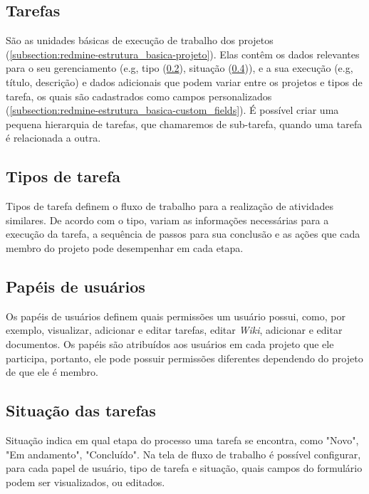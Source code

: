 \subsection{Tarefas}\label{subsection:redmine-estrutura_basica-tarefa}

São as unidades básicas de execução de trabalho dos projetos (\ref{subsection:redmine-estrutura_basica-projeto}). Elas contêm os dados relevantes para o seu gerenciamento (e.g, tipo (\ref{subsection:redmine-estrutura_basica-tracker}), situação (\ref{subsection:redmine-estrutura_basica-status})), e a sua execução (e.g, título, descrição) e dados adicionais que podem variar entre os projetos e tipos de tarefa, os quais são cadastrados como campos personalizados (\ref{subsection:redmine-estrutura_basica-custom_fields}). É possível criar uma pequena hierarquia de tarefas, que chamaremos de sub-tarefa, quando uma tarefa é relacionada a outra.

\subsection{Tipos de tarefa}\label{subsection:redmine-estrutura_basica-tracker}

Tipos de tarefa definem o fluxo de trabalho para a realização de atividades similares. De acordo com o tipo, variam as informações necessárias para a execução da tarefa, a sequência de passos para sua conclusão e as ações que cada membro do projeto pode desempenhar em cada etapa.

\subsection{Papéis de usuários}\label{subsection:redmine-estrutura_basica-role}

Os papéis de usuários definem quais permissões um usuário possui, como, por exemplo, visualizar, adicionar e editar tarefas, editar \textit{Wiki}, adicionar e editar documentos. Os papéis são atribuídos aos usuários em cada projeto que ele participa, portanto, ele pode possuir permissões diferentes dependendo do projeto de que ele é membro.

\subsection{Situação das tarefas}\label{subsection:redmine-estrutura_basica-status}

Situação indica em qual etapa do processo uma tarefa se encontra, como "Novo", "Em andamento", "Concluído". Na tela de fluxo de trabalho é possível configurar, para cada papel de usuário, tipo de tarefa e situação, quais campos do formulário podem ser visualizados, ou editados.

